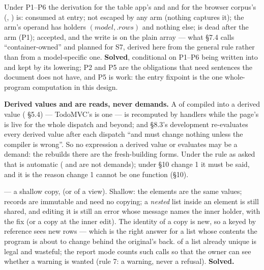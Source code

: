 Under P1–P6 the derivation for the table app's  and  and for the browser corpus's  (, ) is:  consumed at entry;  not escaped by any arm (nothing captures it); the arm's operand  has holders $(\mathit{model},\allowbreak{}.\mathit{rows})$ and nothing else;  is dead after the arm (P1); accepted, and the write is  on the plain array — what  §7.4 calls “container-owned” and planned for S7, derived here from the general rule rather than from a model-specific one. \textbf{Solved}, conditional on P1–P6 being written into  and kept by its lowering; P2 and P5 are the obligations that need sentences the document does not have, and P5 is work: the entry fixpoint is the one whole-program computation in this design.

\textbf{Derived values and  are reads, never demands.} A  of  compiled into a derived value ( §5.4) — TodoMVC's  is one — is recomputed by handlers while the page's  is live for the whole dispatch and beyond; and §8.3's development  re-evaluates every derived value after each dispatch “and must change nothing unless the compiler is wrong”. So no expression a derived value or  evaluates may be a demand: the rebuilds there are the fresh-building forms. Under the rule as asked that is automatic ( and  are not demands); under §10 change 1 it must be said, and it is the reason change 1 cannot be one function (§10).


 — a shallow copy,  (or  of a view). Shallow: the elements are the same values; records are immutable and need no copying; a \emph{nested} list inside an element is still shared, and editing it is still an error whose message names the inner holder, with the fix  (or a copy at the inner edit). The identity of a copy is new, so a  keyed by reference sees new rows — which is the right answer for a list whose contents the program is about to change behind the original's back.  of a list already unique is legal and wasteful; the report mode counts such calls so that the owner can see whether a  warning is wanted (rule 7: a warning, never a refusal). \textbf{Solved.}


